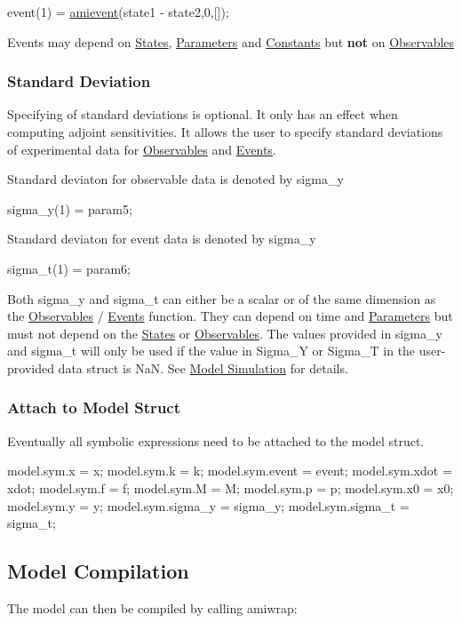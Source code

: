 \begin{DoxyCode}
event(1) = \hyperlink{classamievent}{amievent}(state1 - state2,0,[]); 
\end{DoxyCode}


Events may depend on \hyperlink{def_simu_states}{States}, \hyperlink{def_simu_parameters}{Parameters} and \hyperlink{def_simu_constants}{Constants} but {\bfseries not} on \hyperlink{def_simu_observables}{Observables}\hypertarget{def_simu_std}{}\subsubsection{Standard Deviation}\label{def_simu_std}
Specifying of standard deviations is optional. It only has an effect when computing adjoint sensitivities. It allows the user to specify standard deviations of experimental data for \hyperlink{def_simu_observables}{Observables} and \hyperlink{def_simu_events}{Events}.

Standard deviaton for observable data is denoted by sigma\+\_\+y


\begin{DoxyCode}
sigma\_y(1) = param5; 
\end{DoxyCode}


Standard deviaton for event data is denoted by sigma\+\_\+y


\begin{DoxyCode}
sigma\_t(1) = param6; 
\end{DoxyCode}


Both sigma\+\_\+y and sigma\+\_\+t can either be a scalar or of the same dimension as the \hyperlink{def_simu_observables}{Observables} / \hyperlink{def_simu_events}{Events} function. They can depend on time and \hyperlink{def_simu_parameters}{Parameters} but must not depend on the \hyperlink{def_simu_states}{States} or \hyperlink{def_simu_observables}{Observables}. The values provided in sigma\+\_\+y and sigma\+\_\+t will only be used if the value in Sigma\+\_\+\+Y or Sigma\+\_\+\+T in the user-\/provided data struct is Na\+N. See \hyperlink{def_simu_simulation}{Model Simulation} for details.\hypertarget{def_simu_attach}{}\subsubsection{Attach to Model Struct}\label{def_simu_attach}
Eventually all symbolic expressions need to be attached to the model struct.


\begin{DoxyCode}
model.sym.x = x;
model.sym.k = k;
model.sym.event = event;
model.sym.xdot = xdot;
model.sym.f = f;
model.sym.M = M; %
model.sym.p = p;
model.sym.x0 = x0;
model.sym.y = y;
model.sym.sigma\_y = sigma\_y;
model.sym.sigma\_t = sigma\_t;
\end{DoxyCode}
\hypertarget{def_simu_compilation}{}\subsection{Model Compilation}\label{def_simu_compilation}
The model can then be compiled by calling amiwrap\+:


